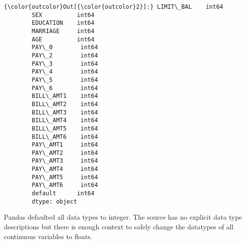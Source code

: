 \documentclass[11pt]{article}
\begin{document}
\begin{Verbatim}[commandchars=\\\{\}]
{\color{outcolor}Out[{\color{outcolor}2}]:} LIMIT\_BAL    int64
        SEX          int64
        EDUCATION    int64
        MARRIAGE     int64
        AGE          int64
        PAY\_0        int64
        PAY\_2        int64
        PAY\_3        int64
        PAY\_4        int64
        PAY\_5        int64
        PAY\_6        int64
        BILL\_AMT1    int64
        BILL\_AMT2    int64
        BILL\_AMT3    int64
        BILL\_AMT4    int64
        BILL\_AMT5    int64
        BILL\_AMT6    int64
        PAY\_AMT1     int64
        PAY\_AMT2     int64
        PAY\_AMT3     int64
        PAY\_AMT4     int64
        PAY\_AMT5     int64
        PAY\_AMT6     int64
        default      int64
        dtype: object
\end{Verbatim}
            
    Pandas defaulted all data types to integer. The source has no explicit
data type descriptions but there is enough context to safely change the
datatypes of all continuous variables to floats.
\end{document}
